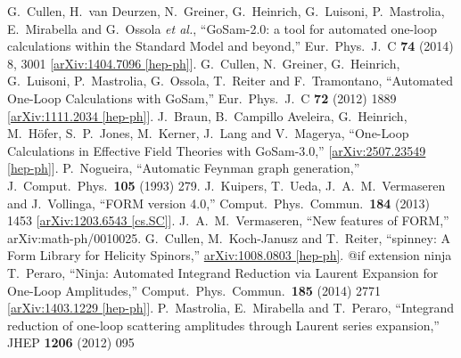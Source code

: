 {{{{{{{{\begin{thebibliography}{ABC}
  G.~Cullen, H.~van Deurzen, N.~Greiner, G.~Heinrich, G.~Luisoni, P.~Mastrolia, E.~Mirabella and G.~Ossola {\it et al.},
  ``GoSam-2.0: a tool for automated one-loop calculations within the Standard Model and beyond,''
  Eur.\ Phys.\ J.\ C {\bf 74} (2014) 8,  3001
  [\href{http://arxiv.org/abs/1404.7096}{arXiv:1404.7096 [hep-ph]}].
  G.~Cullen, N.~Greiner, G.~Heinrich, G.~Luisoni, P.~Mastrolia, G.~Ossola, T.~Reiter and F.~Tramontano,
  ``Automated One-Loop Calculations with GoSam,''
  Eur.\ Phys.\ J.\ C {\bf 72} (2012) 1889
  [\href{http://arxiv.org/abs/1111.2034}{arXiv:1111.2034 [hep-ph]}].
  J.~Braun, B.~Campillo Aveleira, G.~Heinrich, M.~H{\"o}fer, S.~P.~Jones, M.~Kerner, J.~Lang and V.~Magerya,
  ``One-Loop Calculations in Effective Field Theories with GoSam-3.0,''
  [\href{http://arxiv.org/abs/2507.23549}{arXiv:2507.23549 [hep-ph]}].
  P.~Nogueira,
  ``Automatic Feynman graph generation,''
  J.\ Comput.\ Phys.\  {\bf 105} (1993) 279.
  J.~Kuipers, T.~Ueda, J.~A.~M.~Vermaseren and J.~Vollinga,
  ``FORM version 4.0,''
  Comput.\ Phys.\ Commun.\  {\bf 184} (2013) 1453
  [\href{http://arxiv.org/abs/1203.6543}{arXiv:1203.6543 [cs.SC]}].
  J.~A.~M.~Vermaseren,
  ``New features of FORM,''
  arXiv:math-ph/0010025.
  G.~Cullen, M.~Koch-Janusz and T.~Reiter,
  ``spinney: A Form Library for Helicity Spinors,''
  \href{http://arxiv.org/abs/1008.0803}{arXiv:1008.0803 [hep-ph]}.
@if extension ninja %
  T.~Peraro,
  ``Ninja: Automated Integrand Reduction via Laurent Expansion for One-Loop Amplitudes,''
  Comput.\ Phys.\ Commun.\  {\bf 185} (2014) 2771
  [\href{http://arxiv.org/abs/1403.1229}{arXiv:1403.1229 [hep-ph]}].
  P.~Mastrolia, E.~Mirabella and T.~Peraro,
  ``Integrand reduction of one-loop scattering amplitudes through Laurent series expansion,''
  JHEP {\bf 1206} (2012) 095

\end{thebibliography}}}}}}}}}
